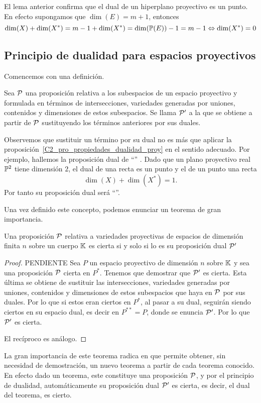 \begin{obs}
	El lema anterior confirma que el dual de un hiperplano proyectivo es un punto. En efecto supongamos que $\dim(E)=m+1$, entonces
	\begin{equation*}
	\dim(X)+\dim(X^*)=m-1+\dim(X^*)=\dim(\mathbb{P}(E))-1=m-1\Leftrightarrow \dim(X^*)=0
	\end{equation*}
\end{obs}

\subsection{Principio de dualidad para espacios proyectivos}
Comencemos con una definición.
\begin{defi}
	Sea $\mathcal{P}$ una proposición relativa a los subespacios de un espacio proyectivo y formulada en términos de intersecciones, variedades generadas por uniones, contenidos y dimensiones de estos subespacios. Se llama  $\mathcal{P}'$ a la que se obtiene a partir de $\mathcal{P}$ sustituyendo los términos anteriores por sus duales.
\end{defi}
Observemos que sustituir un término por su dual no es más que aplicar la proposición~\ref{C2_pro_propiedades_dualidad_proy} en el sentido adecuado. Por ejemplo, hallemos la proposición dual de ``'' . Dado que un plano proyectivo real $\mathbb{P}^2$ tiene dimensión $2$, el dual de una recta es un punto y el de un punto una recta
\begin{equation*}
\dim(X)+\dim(X^*)=1. 
\end{equation*}
Por tanto su proposición dual será ``''.

Una vez definido este concepto, podemos enunciar un teorema de gran importancia.
\begin{theo} Una proposición $\mathcal{P}$ relativa a variedades proyectivas de espacios de dimensión finita $n$ sobre un cuerpo $\mathbb{K}$ es cierta si y solo si lo es su proposición dual $\mathcal{P}'$
\end{theo}
\begin{proof}PENDIENTE
	Sea $P$ un espacio proyectivo de dimensión $n$ sobre $\mathbb{K}$ y sea una proposición $\mathcal{P}$ cierta en $P^*$. Tenemos que demostrar que $\mathcal{P}'$ es cierta. Esta última se obtiene de sustituir las intersecciones, variedades generadas por uniones, contenidos y dimensiones de estos subespacios que haya en $\mathcal{P}$ por sus duales. Por lo que si estos eran ciertos en $P^*$, al pasar a su dual, seguirán siendo ciertos en su espacio dual, es decir en $P^{**}=P$, donde se enuncia $\mathcal{P}'$. Por lo que $\mathcal{P}'$ es cierta.
	
	El recíproco es análogo.
\end{proof}
La gran importancia de este teorema radica en que permite obtener, sin necesidad de demostración, un nuevo teorema a partir de cada teorema conocido. En efecto dado un teorema, este constituye una proposición $\mathcal{P}$, y por el principio de dualidad, automáticamente su proposición dual $\mathcal{P}'$ es cierta, es decir, el dual del teorema, es cierto.

